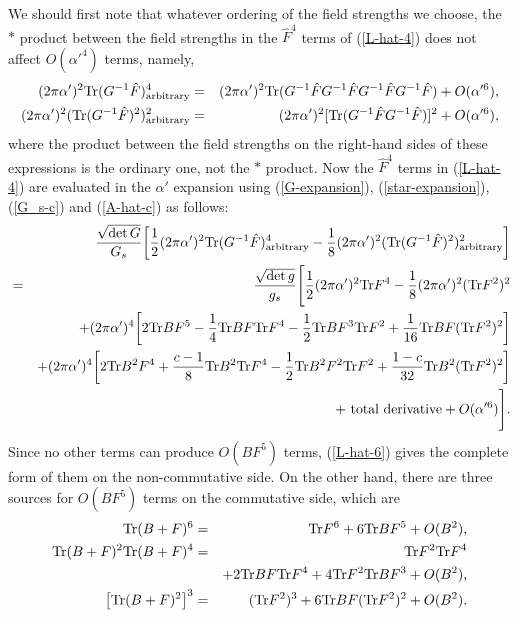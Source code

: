 \documentclass[a4paper,12pt]{article}
\begin{document}
We should first note that whatever ordering
of the field strengths we choose,
the $\ast$ product between the field strengths
in the $\hat{F}^4$ terms of (\ref{L-hat-4})
does not affect $O(\alpha'^4)$ terms, namely,
\begin{eqnarray}
(2 \pi \alpha')^2 {\rm Tr} ( G^{-1} \hat{F} )^4_{\rm arbitrary}
&=& (2 \pi \alpha')^2 {\rm Tr} ( G^{-1} \hat{F} G^{-1} \hat{F}
G^{-1} \hat{F} G^{-1} \hat{F} )
+ O(\alpha'^6), \\
(2 \pi \alpha')^2
( {\rm Tr} ( G^{-1} \hat{F} )^2 )^2_{\rm arbitrary}
&=& (2 \pi \alpha')^2 [
{\rm Tr} ( G^{-1} \hat{F} G^{-1} \hat{F} ) ]^2
+ O(\alpha'^6),
\end{eqnarray}
where the product between the field strengths
on the right-hand sides of these expressions
is the ordinary one, not the $\ast$ product.
Now the $\hat{F}^4$ terms in (\ref{L-hat-4})
are evaluated in the $\alpha'$ expansion
using (\ref{G-expansion}), (\ref{star-expansion}),
(\ref{G_s-c}) and (\ref{A-hat-c})
as follows:
\begin{eqnarray}
&& \frac{\sqrt{\det G}}{G_s} 
\biggl[
\frac{1}{2} (2 \pi \alpha')^2
{\rm Tr} ( G^{-1} \hat{F} )^4_{\rm arbitrary}
-\frac{1}{8} (2 \pi \alpha')^2
( {\rm Tr} ( G^{-1} \hat{F} )^2 )^2_{\rm arbitrary}
\biggr]
\nonumber \\
&=& \frac{\sqrt{\det g}}{g_s} 
\Biggl[
\frac{1}{2} (2 \pi \alpha')^2  {\rm Tr} F^4
-\frac{1}{8} (2 \pi \alpha')^2 ( {\rm Tr} F^2 )^2
\nonumber \\
&& + (2 \pi \alpha')^4 \biggl[
2 {\rm Tr} B F^5 -\frac{1}{4} {\rm Tr} BF {\rm Tr} F^4
-\frac{1}{2} {\rm Tr} BF^3 {\rm Tr} F^2
+\frac{1}{16} {\rm Tr} BF ( {\rm Tr} F^2 )^2
\biggr]
\nonumber \\
&& + (2 \pi \alpha')^4 \biggl[
2 {\rm Tr} B^2 F^4
+ \frac{c-1}{8} {\rm Tr} B^2 {\rm Tr} F^4
-\frac{1}{2} {\rm Tr} B^2 F^2 {\rm Tr} F^2
+\frac{1-c}{32} {\rm Tr} B^2 ( {\rm Tr} F^2 )^2
\biggr]
\nonumber \\
&& + {\rm ~total~derivative} + O(\alpha'^6) \Biggr].
\label{L-hat-6}
\end{eqnarray}
Since no other terms can produce
$O(B F^5)$ terms,
(\ref{L-hat-6}) gives the complete form
of them on the non-commutative side.
On the other hand, there are three sources for $O(BF^5)$ terms
on the commutative side, which are
\begin{eqnarray}
{\rm Tr} (B+F)^6 &=& {\rm Tr} F^6 + 6 {\rm Tr} B F^5 + O(B^2), \\
{\rm Tr} (B+F)^2 {\rm Tr} (B+F)^4
&=& {\rm Tr} F^2 {\rm Tr} F^4
\nonumber \\
&& + 2 {\rm Tr} B F {\rm Tr} F^4
+ 4 {\rm Tr} F^2 {\rm Tr} B F^3 + O(B^2), \\
\left[ {\rm Tr} (B+F)^2 \right]^3
&=& ( {\rm Tr} F^2 )^3 + 6 {\rm Tr} B F ( {\rm Tr} F^2 )^2
+ O(B^2).
\end{eqnarray}
\end{document}
